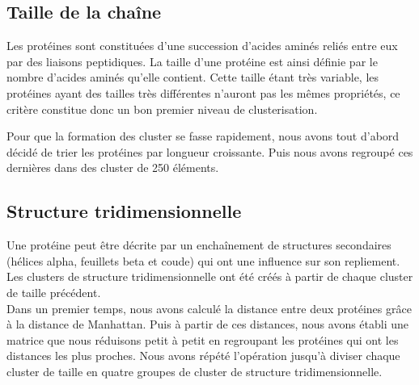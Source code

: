 \subsection*{Taille de la chaîne}
Les protéines sont constituées d'une succession d'acides aminés reliés entre eux par des liaisons peptidiques. La taille d'une protéine est ainsi définie par le nombre d'acides aminés qu'elle contient. Cette taille étant très variable, les protéines ayant des tailles très différentes n'auront pas les m\^emes propriétés, ce critère constitue donc un bon premier niveau de clusterisation.

Pour que la formation des cluster se fasse rapidement, nous avons tout d'abord décidé de trier les protéines par longueur croissante. Puis nous avons regroupé ces dernières dans des cluster de 250 éléments.

\subsection*{Structure tridimensionnelle}
Une protéine peut être décrite par un enchaînement de structures secondaires (hélices alpha, feuillets beta et coude) qui ont une influence sur son repliement.\\
Les clusters de structure tridimensionnelle ont été créés à partir de chaque cluster de taille précédent.\\
Dans un premier temps, nous avons calculé la distance entre deux protéines gr\^ace à la distance de Manhattan.
Puis à partir de ces distances, nous avons établi une matrice que nous réduisons petit à petit en regroupant les protéines qui ont les distances les plus proches. Nous avons répété l'opération jusqu'à diviser chaque cluster de taille en quatre groupes de cluster de structure tridimensionnelle.

